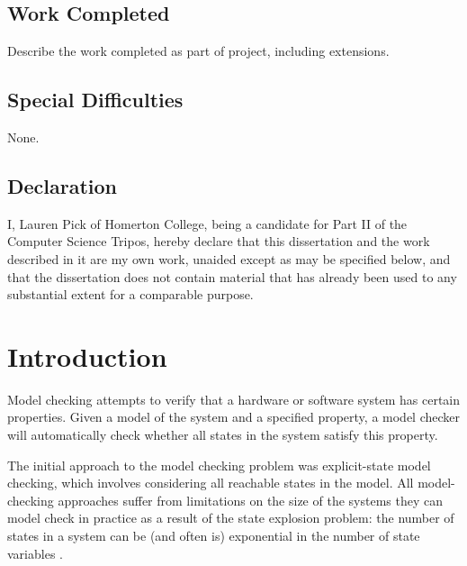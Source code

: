 \documentclass[12pt,a4paper,twoside,openright]{report}
\begin{document}
\section*{Work Completed}

Describe the work completed as part of project, including extensions.

\section*{Special Difficulties}

None.
 
\newpage
\section*{Declaration}

I, Lauren Pick of Homerton College, being a candidate for Part II of the Computer
Science Tripos, hereby declare
that this dissertation and the work described in it are my own work,
unaided except as may be specified below, and that the dissertation
does not contain material that has already been used to any substantial
extent for a comparable purpose.

\bigskip
{}

\medskip
{}

\tableofcontents





\pagestyle{headings}

\chapter{Introduction}


Model checking attempts to verify that a hardware or
software system has certain properties. Given a model of the system
and a specified property, a model checker will automatically check
whether all states in the system satisfy this property.

The initial approach to the model checking problem was explicit-state
model checking, which involves considering all reachable states in the
model. All model-checking approaches suffer from limitations on the size
of the systems they can model check in practice as a result of
the state explosion problem: the number of
states in a system can be (and often is) exponential in the
number of state variables \cite{Clarke2012}. 
\end{document}
